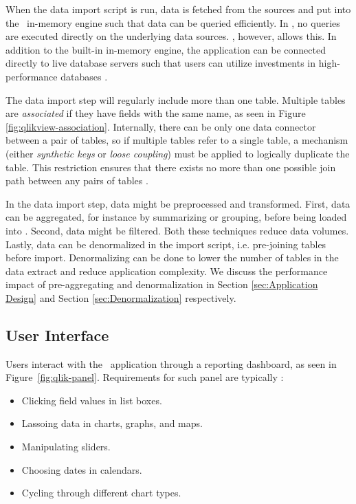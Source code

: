 When the data import script is run, data is fetched from the sources and put into the \qlikview~in-memory engine such that data can be queried efficiently. In \qlikview, no queries are executed directly on the underlying data sources. \tableau, however, allows this. In addition to the built-in in-memory engine, the application can be connected directly to live database servers such that users can utilize investments in high-performance databases \cite{Kamkolkar2015-iq}.



The data import step will regularly include more than one table. Multiple tables are \textit{associated} if they have fields with the same name, as seen in Figure \ref{fig:qlikview-association}. Internally, there can be only one data connector between a pair of tables, so if multiple tables refer to a single table, a mechanism (either \textit{synthetic keys} or \textit{loose coupling}) must be applied to logically duplicate the table. This restriction ensures that there exists no more than one possible join path between any pairs of tables \cite{noauthor_undated-js}.

In the data import step, data might be preprocessed and transformed. First, data can be aggregated, for instance by summarizing or grouping, before being loaded into \qlikview. Second, data might be filtered. Both these techniques reduce data volumes. Lastly, data can be denormalized in the import script, i.e. pre-joining tables before import. Denormalizing can be done to lower the number of tables in the data extract and reduce application complexity. We discuss the performance impact of pre-aggregating and denormalization in Section \ref{sec:Application Design} and Section \ref{sec:Denormalization} respectively.

\subsection{User Interface}
\label{sub:User Interface}
Users interact with the \bd~application through a reporting dashboard, as seen in Figure~\ref{fig:qlik-panel}. Requirements for such panel are typically \cite{Qlik2014-vd}:
\begin{itemize}
  \item Clicking field values in list boxes.
  \item Lassoing data in charts, graphs, and maps.
  \item Manipulating sliders.
  \item Choosing dates in calendars.
  \item Cycling through different chart types.
\end{itemize}

